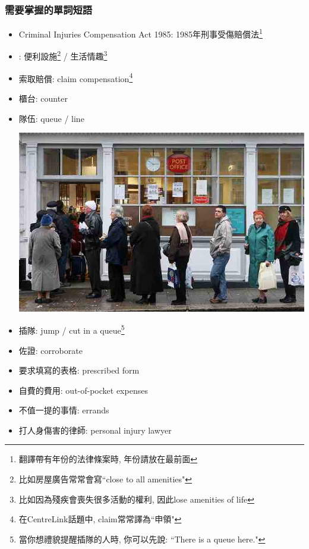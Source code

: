 \subsubsection*{需要掌握的單詞短語}
\begin{multicols}{2}
\begin{itemize}
  \itemsep0em
  \item Criminal Injuries Compensation Act 1985: 1985年刑事受傷賠償法\footnote{翻譯帶有年份的法律條案時, 年份請放在最前面}
  \item {}: 便利設施\footnote{比如房屋廣告常常會寫``close to all amenities"} / 生活情趣\footnote{比如因為殘疾會喪失很多活動的權利, 因此lose amenities of life}
  \item 索取賠償: claim compensation\footnote{在CentreLink話題中, claim常常譯為``申領"}
  \item 櫃台: counter
  \item 隊伍: queue / line
  \begin{center}
  	\includegraphics[scale=.38]{pics/queue}
  \end{center}
  \item 插隊: jump / cut in a queue\footnote{當你想禮貌提醒插隊的人時, 你可以先說: ``There is a queue here."}
  \item 佐證: corroborate
  \item 要求填寫的表格: prescribed form
  \item 自費的費用: out-of-pocket expenses
  \item 不值一提的事情: errands
  \item 打人身傷害的律師: personal injury lawyer
\end{itemize}
\end{multicols}

